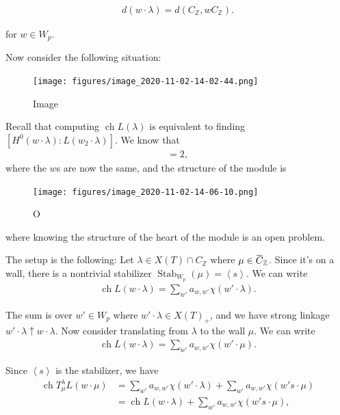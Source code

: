 \begin{align*}  
d(w\cdot \lambda) = d(C_{\mathbb{Z}}, wC_{\mathbb{Z}})
.\end{align*}

for \(w\in W_p\).

Now consider the following situation:

\begin{figure}
\centering
\texttt{[image: figures/image\_2020-11-02-14-02-44.png]}
\caption{Image}
\end{figure}

Recall that computing \(\operatorname{ch}L(\lambda)\) is equivalent to
finding \([H^0(w\cdot \lambda): L(w_2\cdot \lambda)]\). We know that
\begin{align*}  
[T_\mu^\lambda (L(w\cdot\mu)) : L(w\cdot \mu)] = 2
,\end{align*}
where the \(w\)s are now the same, and the structure of the module is

\begin{figure}
\centering
\texttt{[image: figures/image\_2020-11-02-14-06-10.png]}
\caption{O}
\end{figure}

where knowing the structure of the heart of the module is an open
problem.

The setup is the following: Let \(\lambda\in X(T) \cap C_{\mathbb{Z}}\)
where
\(\mu \in \mkern 1.5mu\overline{\mkern-1.5muC\mkern-1.5mu}\mkern 1.5mu_{\mathbb{Z}}\).
Since it's on a wall, there is a nontrivial stabilizer
\({\operatorname{Stab}}_{W_p}(\mu) = \left\langle{s}\right\rangle\). We
can write
\begin{align*}  
\operatorname{ch}L(w\cdot \lambda) = \sum_{w'} a_{w, w'} \chi(w' \cdot \lambda)
.\end{align*}

The sum is over \(w'\in W_p\) where \(w'\cdot \lambda \in X(T)_+\), and
we have strong linkage \(w'\cdot \lambda \uparrow w\cdot \lambda\). Now
consider translating from \(\lambda\) to the wall \(\mu\). We can write
\begin{align*}  
\operatorname{ch}L(w\cdot \lambda) = \sum_{w'} a_{w, w'} \chi(w' \cdot \mu)
.\end{align*}

Since \(\left\langle{s}\right\rangle\) is the stabilizer, we have
\begin{align*}  
\operatorname{ch}T_\mu^\lambda L(w\cdot \mu)
&= \sum_{w'} a_{w, w'} \chi(w' \cdot \lambda)
+ \sum_{w'} a_{w, w'} \chi(w's \cdot \mu) \\
&= \operatorname{ch}L(w\cdot \lambda)
+ \sum_{w'} a_{w, w'} \chi(w's \cdot \mu)
,\end{align*}


